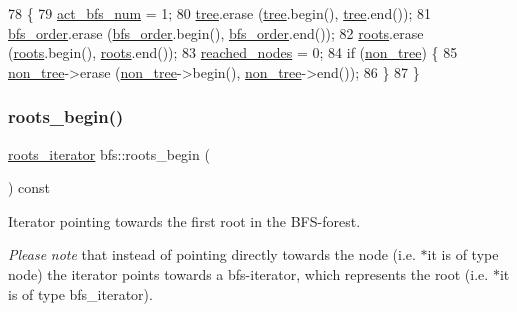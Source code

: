 \begin{DoxyCode}
78 \{
79     \mbox{\hyperlink{classbfs_a5a4adad9562896536b8b58ab237e8478}{act\_bfs\_num}} = 1;
80     \mbox{\hyperlink{classbfs_a8bc83afea6d1066ea4ceca3007799912}{tree}}.erase (\mbox{\hyperlink{classbfs_a8bc83afea6d1066ea4ceca3007799912}{tree}}.begin(), \mbox{\hyperlink{classbfs_a8bc83afea6d1066ea4ceca3007799912}{tree}}.end());
81     \mbox{\hyperlink{classbfs_a2596d2cf52f6e7922fd94ce1adde760e}{bfs\_order}}.erase (\mbox{\hyperlink{classbfs_a2596d2cf52f6e7922fd94ce1adde760e}{bfs\_order}}.begin(), \mbox{\hyperlink{classbfs_a2596d2cf52f6e7922fd94ce1adde760e}{bfs\_order}}.end());
82     \mbox{\hyperlink{classbfs_acea071a6fdad8e590b40830ced241824}{roots}}.erase (\mbox{\hyperlink{classbfs_acea071a6fdad8e590b40830ced241824}{roots}}.begin(), \mbox{\hyperlink{classbfs_acea071a6fdad8e590b40830ced241824}{roots}}.end());
83     \mbox{\hyperlink{classbfs_ac3db80b59d5db049199936445a6c2da8}{reached\_nodes}} = 0;
84     \textcolor{keywordflow}{if} (\mbox{\hyperlink{classbfs_a056b2131db11e62eb8f41c8dcc117d2e}{non\_tree}}) \{
85     \mbox{\hyperlink{classbfs_a056b2131db11e62eb8f41c8dcc117d2e}{non\_tree}}->erase (\mbox{\hyperlink{classbfs_a056b2131db11e62eb8f41c8dcc117d2e}{non\_tree}}->begin(), \mbox{\hyperlink{classbfs_a056b2131db11e62eb8f41c8dcc117d2e}{non\_tree}}->end());
86     \}
87 \}
\end{DoxyCode}
\mbox{\label{classbfs_a45d58d06d0dcd6427edad2ec52a6ebb9}} 
\subsubsection{\texorpdfstring{roots\+\_\+begin()}{roots\_begin()}}
{\footnotesize\ttfamily \mbox{\hyperlink{classbfs_a70b915179053a2993154614d4358fdc1}{roots\+\_\+iterator}} bfs\+::roots\+\_\+begin (\begin{DoxyParamCaption}{ }\end{DoxyParamCaption}) const\hspace{0.3cm}{\ttfamily [inline]}}



Iterator pointing towards the first root in the B\+F\+S-\/forest. 

{\itshape Please} {\itshape note} that instead of pointing directly towards the node (i.\+e. {\ttfamily $\ast$it} is of type {\ttfamily node}) the iterator points towards a bfs-\/iterator, which represents the root (i.\+e. {\ttfamily $\ast$it} is of type {\ttfamily bfs\+\_\+iterator}).

